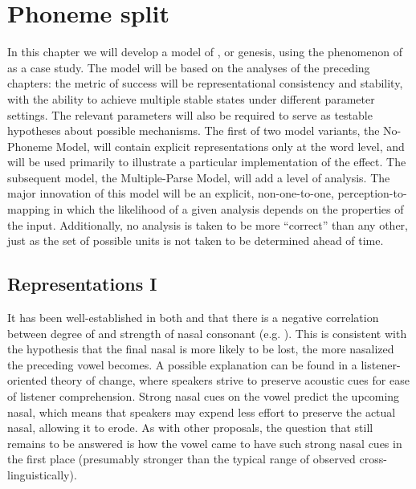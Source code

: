 \chapter{Phoneme split}\label{ch:Phoneme-Split}

In this chapter we will develop a model of , or genesis,
using the phenomenon of  as a case study. The model
will be based on the analyses of the preceding chapters: the metric
of success will be representational consistency and stability, with
the ability to achieve multiple stable states under different parameter
settings. The relevant parameters will also be required to serve as
testable hypotheses about possible  mechanisms. The first
of two model variants, the No-Phoneme Model, will contain explicit
representations only at the word level, and will be used primarily
to illustrate a particular implementation of the  effect.
The subsequent model, the Multiple-Parse Model, will add a 
level of analysis. The major innovation of this model will be an explicit,
non-one-to-one, perception-to- mapping in which the likelihood
of a given analysis depends on the  properties of the input.
Additionally, no analysis is taken to be more ``correct'' than any other,
just as the set of possible  units is not taken to be determined
ahead of time.

\section{Representations I}

It has been well-established in both  and  that
there is a negative correlation between degree of  and strength
of nasal consonant (e.g. \citealt{kawasaki1978perceived,cohn1990phonetic}).
This is consistent with the hypothesis that the final nasal is more
likely to be lost, the more nasalized the preceding vowel becomes.
A possible explanation can be found in a listener-oriented theory
of change, where speakers strive to preserve acoustic cues for ease
of listener comprehension. Strong nasal cues on the vowel predict
the upcoming nasal, which means that speakers may expend less effort
to preserve the actual nasal, allowing it to erode. As with other
proposals, the question that still remains to be answered is how the
vowel came to have such strong nasal cues in the first place (presumably
stronger than the typical range of   observed
cross-linguistically). 


